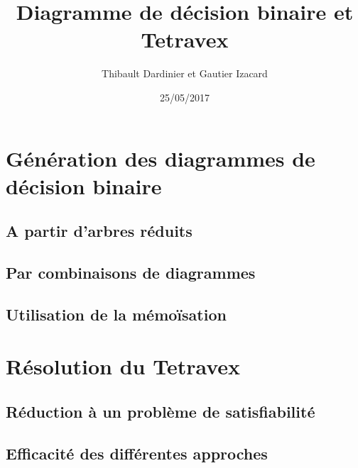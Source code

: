\documentclass[11pt]{article}
\begin{document}
\title{Diagramme de décision binaire et Tetravex}
\author{Thibault Dardinier et Gautier Izacard}
\date{25/05/2017}
\maketitle
\tableofcontents

\section{Génération des diagrammes de décision binaire}
\subsection{A partir d'arbres réduits}
\subsection{Par combinaisons de diagrammes}
\subsection{Utilisation de la mémoïsation}
\section{Résolution du Tetravex}
\subsection{Réduction à un problème de satisfiabilité}
\subsection{Efficacité des différentes approches}
\end{document}
